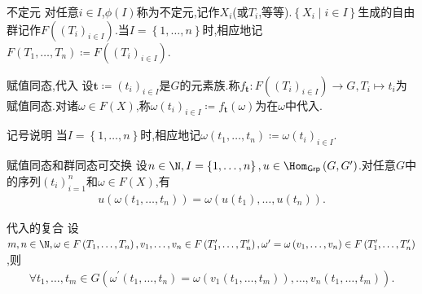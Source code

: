 \begin{definition}{不定元}{}
	对任意$i\in I$,$\phi\left(I\right)$称为不定元,记作$X_{i}$(或$T_{i}$,等等).$\left\{X_{i}\middle|i\in I\right\}$生成的自由群记作$F\left(\left(T_{i}\right)_{i\in I}\right)$.当$I=\left\{1,\ldots,n\right\}$时,相应地记$F\left(T_{1},\ldots,T_{n}\right)\coloneq F\left(\left(T_{i}\right)_{i\in I}\right)$.
\end{definition}

\begin{definition}{赋值同态,代入}{}
	设$\mathbf{t}\coloneq\left(t_{i}\right)_{i\in I}$是$G$的元素族.称$f_{\mathbf{t}}:F\left(\left(T_{i}\right)_{i\in I}\right)\to G,T_{i}\mapsto t_{i}$为赋值同态.对诸$\omega\in F\left(X\right)$,称$\omega\left(t_{i}\right)_{i\in I}\coloneq f_{\mathbf{t}}\left(\omega\right)$为在$\omega$中代入.
\end{definition}

\begin{remark}{记号说明}{}
	当$I=\left\{1,\ldots,n\right\}$时,相应地记$\omega\left(t_{1},\ldots,t_{n}\right)\coloneq\omega\left(t_{i}\right)_{i\in I}$.
\end{remark}

\begin{proposition}{赋值同态和群同态可交换}{}
	设$n\in\N,I=\left\{1,\ldots,n\right\},u\in\Hom_{\mathsf{Grp}}\left(G,G^{\prime}\right)$.对任意$G$中的序列$\left(t_{i}\right)_{i=1}^{n}$和$\omega\in F\left(X\right)$,有
	\begin{align*}
		u\left(\omega\left(t_{1},\ldots,t_{n}\right)\right)=\omega\left(u\left(t_{1}\right),\ldots,u\left(t_{n}\right)\right).
	\end{align*}
\end{proposition}

\begin{proposition}{代入的复合}{}
	设$m,n\in\N,\omega\in F\left(T_{1},\ldots,T_{n}\right),v_{1},\ldots,v_{n}\in F\left(T_{1}^{\prime},\ldots,T_{n}^{\prime}\right),\omega^{\prime}=\omega\left(v_{1},\ldots,v_{n}\right)\in F\left(T_{1}^{\prime},\ldots,T_{n}^{\prime}\right)$,则
	\begin{align*}
		\forall t_{1},\ldots,t_{m}\in G\left(\omega^{\prime}\left(t_{1},\ldots,t_{n}\right)=\omega\left(v_{1}\left(t_{1},\ldots,t_{m}\right)\right),\ldots,v_{n}\left(t_{1},\ldots,t_{m}\right)\right).
	\end{align*}
\end{proposition}




































